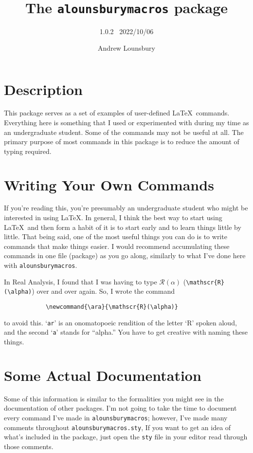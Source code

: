 \documentclass[12pt]{article}
\begin{document}
    \title{The \texttt{alounsburymacros} package}
    \author{1.0.2 \ 2022/10/06}
    \date{Andrew Lounsbury}
    \maketitle

    \section{Description}
    This package serves as a set of examples of user-defined \LaTeX\ commands. Everything here is something that I used or experimented with during my time as an undergraduate student. Some of the commands may not be useful at all. The primary purpose of most commands in this package is to reduce the amount of typing required. 

    \section{Writing Your Own Commands}
    If you're reading this, you're presumably an undergraduate student who might be interested in using \LaTeX. In general, I think the best way to start using \LaTeX\ and then form a habit of it is to start early and to learn things little by little. \p
    That being said, one of the most useful things you can do is to write commands that make things easier. I would recommend accumulating these commands in one file (package) as you go along, similarly to what I've done here with \texttt{alounsburymacros}. 
    \begin{example*}
        In Real Analysis, I found that I was having to type $\mathscr{R}(\alpha)$ (\texttt{\textbackslash mathscr\{R\}(\textbackslash alpha)}) over and over again. So, I wrote the command 
        \begin{verbatim}
            \newcommand{\ara}{\mathscr{R}(\alpha)}
        \end{verbatim}
        to avoid this. `\texttt{ar}' is an onomatopoeic rendition of the letter `R' spoken aloud, and the second `\texttt{a}' stands for ``alpha.'' You have to get creative with naming these things. 
    \end{example*}
    
    \section{Some Actual Documentation}
    Some of this information is similar to the formalities you might see in the documentation of other packages. \p
    I'm not going to take the time to document every command I've made in \texttt{alounsburymacros}; however, I've made many comments throughout \texttt{alounsburymacros.sty}, If you want to get an idea of what's included in the package, just open the \texttt{sty} file in your editor read through those comments. 
\end{document}
